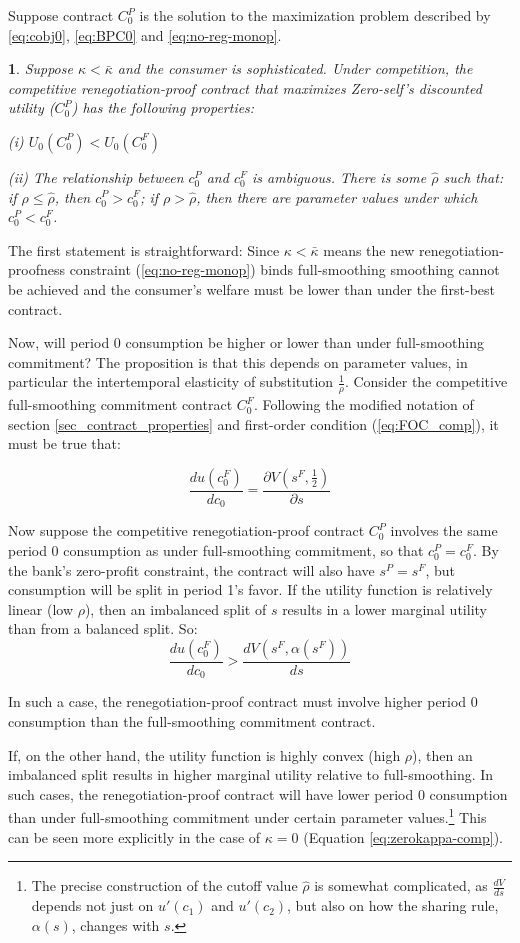 \documentclass[11pt,english]{article}
\theoremstyle{plain}
\newtheorem{prop}{\protect\propositionname}
\theoremstyle{definition}
\providecommand{\propositionname}{Proposition}
\begin{document}
Suppose contract $C_{0}^{P}$ is the solution to the maximization
problem described by \ref{eq:cobj0}, \ref{eq:BPC0} and \ref{eq:no-reg-monop}.
\begin{prop}
Suppose $\kappa<\bar{\kappa}$ and the consumer is sophisticated.
Under competition, the competitive renegotiation-proof contract that
maximizes Zero-self's discounted utility ($C_{0}^{P}$) has the following
properties:

(i) $U_{0}\left(C_{0}^{P}\right)<U_{0}\left(C_{0}^{F}\right)$

(ii) The relationship between $c_{0}^{P}$ and $c_{0}^{F}$ is ambiguous.
There is some $\hat{\rho}$ such that: if $\rho\leq\hat{\rho}$, then
$c_{0}^{P}>c_{0}^{F}$; if $\rho>\hat{\rho}$, then there are parameter
values under which $c_{0}^{P}<c_{0}^{F}$. 
\end{prop}
The first statement is straightforward: Since $\kappa<\bar{\kappa}$
means the new renegotiation-proofness constraint (\ref{eq:no-reg-monop})
binds full-smoothing smoothing cannot be achieved and the consumer's
welfare must be lower than under the first-best contract.

Now, will period 0 consumption be higher or lower than under full-smoothing
commitment? The proposition is that this depends on parameter values,
in particular the intertemporal elasticity of substitution $\frac{1}{\rho}$.
Consider the competitive full-smoothing commitment contract $C_{0}^{F}$.
Following the modified notation of section  \ref{sec_contract_properties} and first-order condition (\ref{eq:FOC_comp}), it
must be true that:

\[
\frac{du\left(c_{0}^{F}\right)}{dc_{0}}=\frac{\partial V\left(s^{F},\frac{1}{2}\right)}{\partial s}
\]

Now suppose the competitive renegotiation-proof contract $C_{0}^{P}$
 involves the same period 0 consumption as under full-smoothing
commitment, so that $c_{0}^{P}=c_{0}^{F}$. By the bank's zero-profit
constraint, the contract will also have $s^{P}=s^{F}$, but consumption
will be split in period 1's favor. If the utility function is relatively
linear (low $\rho$), then an imbalanced split of $s$ results in
a lower marginal utility than from a balanced split. So: 
\[
\frac{du\left(c_{0}^{F}\right)}{dc_{0}}>\frac{dV\left(s^{F},\alpha\left(s^{F}\right)\right)}{ds}
\]

In such a case, the renegotiation-proof contract must involve higher
period 0 consumption than the full-smoothing commitment contract.

If, on the other hand, the utility function is highly convex (high
$\rho$), then an imbalanced split results in higher marginal utility
relative to full-smoothing. In such cases, the renegotiation-proof
contract will have lower period 0 consumption than under full-smoothing
commitment under certain parameter values.\footnote{The precise construction of the cutoff value $\hat{\rho}$ is somewhat
complicated, as $\frac{dV}{ds}$ depends not just on $u'\left(c_{1}\right)$
and $u'\left(c_{2}\right)$, but also on how the sharing rule, $\alpha\left(s\right)$,
changes with $s$.} This can be seen more explicitly in the case of $\kappa=0$ (Equation
\ref{eq:zerokappa-comp}).
\end{document}
